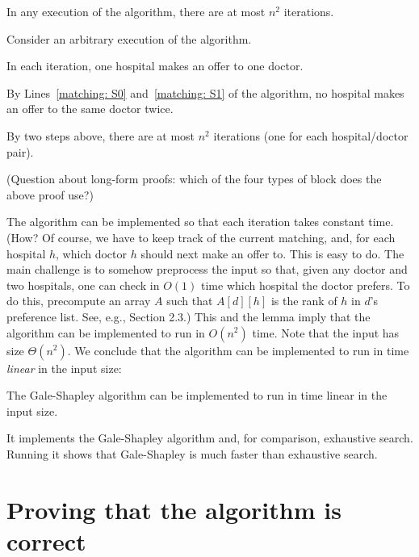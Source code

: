 \documentclass[11pt]{article}
\begin{document}
\begin{lemma}[e.g.~\KT p.\,7 (1.3)]\label{matching: lemma: iterations}
  In any execution of the algorithm, there are at most $n^2$ iterations.
\end{lemma}
\begin{longFormProof}

  \step Consider an arbitrary execution of the algorithm.

  \step In each iteration, one hospital makes an offer to one doctor. 

  \step By Lines~\ref{matching: S0} and~\ref{matching: S1} of the algorithm, no hospital makes an offer to the same doctor twice.

  \step By two steps above, there are at most $n^2$ iterations (one for each hospital/doctor pair).
\end{longFormProof}

\smallskip  
(Question about long-form proofs: which of the four types of block does the above proof use?)
\smallskip 

The algorithm can be implemented so that each iteration takes constant time.  (How?  Of course, we have to keep track of the current matching, and, for each hospital $h$, which doctor $h$ should next make an offer to.  This is easy to do.  The main challenge is to somehow preprocess the input so that, given any doctor and two hospitals, one can check in $O(1)$ time which hospital the doctor prefers.  To do this, precompute an array $A$ such that $A[d][h]$ is the rank of $h$ in $d$'s preference list. See, e.g., \KT Section 2.3.)  This and the lemma imply that the algorithm can be implemented to run in $O(n^2)$ time.  Note that the input has size $\Theta(n^2)$.  We conclude that the algorithm can be implemented to run in time \emph{linear} in the input size:

\begin{lemma}
  The Gale-Shapley algorithm can be implemented to run in time linear in the input size.
\end{lemma}

It implements the Gale-Shapley algorithm and, for comparison, exhaustive search.
Running it shows that Gale-Shapley is much faster than exhaustive search.

\continued

\section{Proving that the algorithm is correct}
\end{document}
